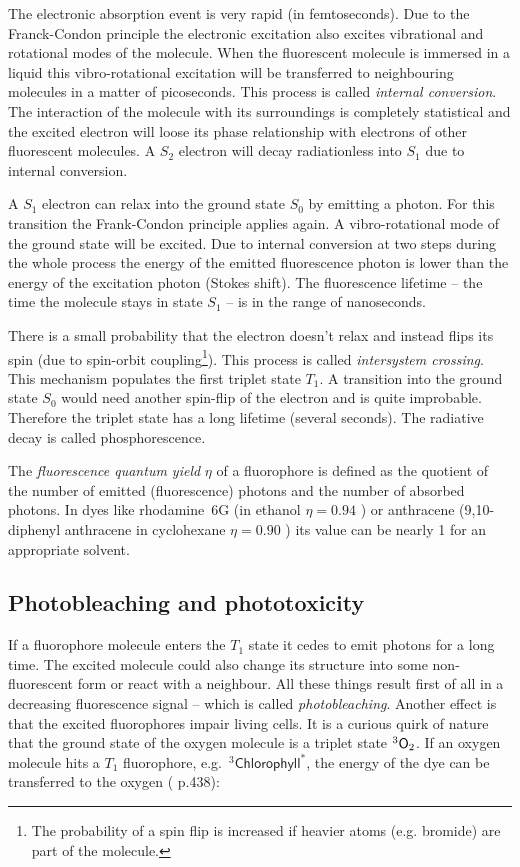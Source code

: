 The electronic absorption event is very rapid (in femtoseconds). Due
to the Franck-Condon principle the electronic excitation also excites
vibrational and rotational modes of the molecule. When the fluorescent
molecule is immersed in a liquid this vibro-rotational excitation will
be transferred to neighbouring molecules in a matter of
picoseconds. This process is called \emph{internal conversion}. The
interaction of the molecule with its surroundings is completely
statistical and the excited electron will loose its phase relationship
with electrons of other fluorescent molecules. A $S_2$ electron will
decay radiationless into $S_1$ due to internal conversion.

A $S_1$ electron can relax into the ground state $S_0$ by emitting a
photon. For this transition the Frank-Condon principle applies
again. A vibro-rotational mode of the ground state will be excited.
Due to internal conversion at two steps during the whole process the
energy of the emitted fluorescence photon is lower than the energy of
the excitation photon (Stokes shift). The fluorescence lifetime -- the
time the molecule stays in state $S_1$ -- is in the range of
nanoseconds.

There is a small probability that the electron doesn't relax and
instead flips its spin (due to spin-orbit coupling\footnote{The
  probability of a spin flip is increased if heavier atoms
  (e.g. bromide) are part of the molecule.}). This process is called
\emph{intersystem crossing}. This mechanism populates the first
triplet state $T_1$. A transition into the ground state $S_0$ would
need another spin-flip of the electron and is quite
improbable. Therefore the triplet state has a long lifetime (several
seconds). The radiative decay is called phosphorescence.
  
The \emph{fluorescence quantum yield} $\eta$ of a fluorophore is
defined as the quotient of the number of emitted (fluorescence)
photons and the number of absorbed photons. In dyes like rhodamine~6G
(in ethanol $\eta=0.94$ \cite{Fischer1996}) or anthracene
(9,10-diphenyl anthracene in cyclohexane $\eta=0.90$ \cite{Hamai1983})
its value can be nearly 1 for an appropriate solvent.

\subsection{Photobleaching and phototoxicity}
    
If a fluorophore molecule enters the $T_1$ state it cedes to emit
photons for a long time. The excited molecule could also change its
structure into some non-fluorescent form or react with a
neighbour. All these things result first of all in a decreasing
fluorescence signal -- which is called \emph{photobleaching}.  Another
effect is that the excited fluorophores impair living cells.  It is a
curious quirk of nature that the ground state of the oxygen molecule
is a triplet state ${}^3\textsf{O}_2$.  If an oxygen molecule hits a $T_1$
fluorophore, e.g.\ ${}^3\textsf{Chlorophyll}^*$, the energy of the dye
can be transferred to the oxygen (\cite{Haken2006} p.438):

